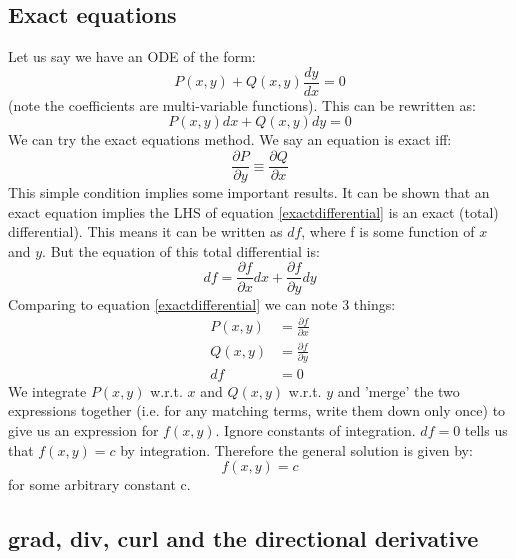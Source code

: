 \documentclass{scrartcl}
\begin{document}
\subsection{Exact equations}
Let us say we have an ODE of the form:
\begin{equation}
P(x, y) + Q(x, y)\frac{dy}{dx} = 0
\end{equation}
(note the coefficients are multi-variable functions). This can be rewritten as:
\begin{equation} \label{exactdifferential}
P(x, y) dx + Q(x, y) dy = 0
\end{equation}
We can try the exact equations method. We say an equation is exact iff:
\begin{equation}
\frac{\partial P}{\partial y} \equiv \frac{\partial Q}{\partial x} 
\end{equation}
This simple condition implies some important results. It can be shown that an exact equation implies the LHS of equation \ref{exactdifferential} is an exact (total) differential). This means it can be written as $ df $, where f is some function of $ x $ and $ y $. But the equation of this total differential is:
\begin{equation}
df = \frac{\partial f}{\partial x}dx + \frac{\partial f}{\partial y}dy
\end{equation}
Comparing to equation \ref{exactdifferential} we can note 3 things:
\begin{equation}
\begin{split}
P(x, y) & = \frac{\partial f}{\partial x} \\
Q(x, y) & = \frac{\partial f}{\partial y} \\
df & = 0
\end{split}
\end{equation}
We integrate $ P(x, y) $ w.r.t. $ x $ and $ Q(x, y) $ w.r.t. $ y $ and 'merge' the two expressions together (i.e. for any matching terms, write them down only once) to give us an expression for $ f(x, y) $. Ignore constants of integration. $ df = 0 $ tells us that $ f(x, y) = c $ by integration. Therefore the general solution is given by:
\begin{equation}
f(x, y) = c
\end{equation}
for some arbitrary constant c.

\subsection{grad, div, curl and the directional derivative}
\end{document}
